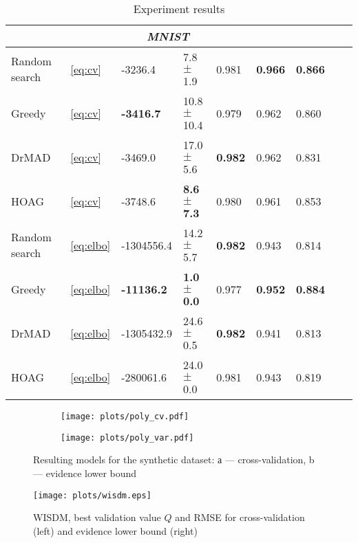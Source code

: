 \documentclass[12pt]{article}
\begin{document}
\begin{table}
\begin{tabularx}{\textwidth}{ |X|X|X|X|X|X|X|X|X|}
\multicolumn{7}{|c|}{\textit{MNIST}}  \\
\hline
Random search & ~\eqref{eq:cv} & -3236.4  & 7.8 $\pm$ 1.9  &   0.981 & \bf 0.966 & \bf 0.866 \\
\hline
Greedy & ~\eqref{eq:cv} & \bf -3416.7 & 10.8 $\pm$ 10.4 & 0.979 & 0.962 & 0.860\\
\hline
DrMAD & ~\eqref{eq:cv} & -3469.0 & 17.0 $\pm$ 5.6 & \bf  0.982 & 0.962 & 0.831\\
\hline
HOAG & ~\eqref{eq:cv} & -3748.6 & \bf 8.6 $\pm$ 7.3&   0.980 &  0.961  & 0.853 \\
\hline
Random search & ~\eqref{eq:elbo} & -1304556.4 &  14.2 $\pm$ 5.7 &  \bf 0.982 & 0.943 & 0.814 \\
\hline
Greedy & ~\eqref{eq:elbo} & \bf -11136.2 & \bf 1.0 $\pm$ 0.0  &  0.977 & \bf 0.952 & \bf 0.884\\
\hline
DrMAD & ~\eqref{eq:elbo} & -1305432.9 & 24.6 $\pm$ 0.5  & \bf 0.982 & 0.941 & 0.813 \\
\hline
HOAG & ~\eqref{eq:elbo} &  -280061.6 & 24.0 $\pm$ 0.0  & 0.981 & 0.943 & 0.819\\
\hline


\hline
\end{tabularx}
\caption{Experiment results}
\label{table:table}
\end{table}

    \begin{figure}

    \begin{subfigure}[b]{0.5\textwidth}
    \texttt{[image: plots/poly\_cv.pdf]}

    \end{subfigure}
    \begin{subfigure}[b]{0.5\textwidth}
    \texttt{[image: plots/poly\_var.pdf]}

    \end{subfigure}

 \caption{Resulting models for the synthetic dataset: а --- cross-validation, b --- evidence lower bound}
  \label{fig:poly}
   
    \end{figure}




    \begin{figure}

    \texttt{[image: plots/wisdm.eps]}
\caption{WISDM,  best validation value $\hat{Q}$ and RMSE  for cross-validation (left) and evidence lower bound (right)}    
\label{fig:wisdm}
    
    \end{figure}
\end{document}
